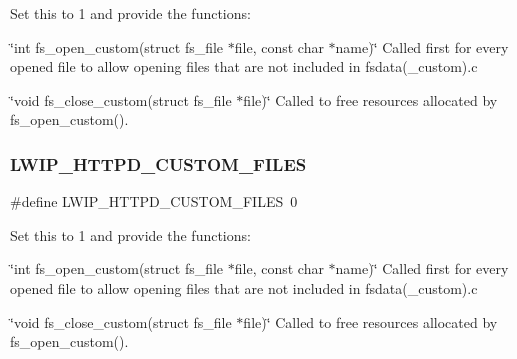 Set this to 1 and provide the functions\+:
\begin{DoxyItemize}
\item \char`\"{}int fs\+\_\+open\+\_\+custom(struct fs\+\_\+file $\ast$file, const char $\ast$name)\char`\"{} Called first for every opened file to allow opening files that are not included in fsdata(\+\_\+custom).c
\item \char`\"{}void fs\+\_\+close\+\_\+custom(struct fs\+\_\+file $\ast$file)\char`\"{} Called to free resources allocated by fs\+\_\+open\+\_\+custom(). 
\end{DoxyItemize}\mbox{\label{group__httpd__opts_gadadb70f5663cdf004bf879e3b5d326bd}} 
\subsubsection{\texorpdfstring{L\+W\+I\+P\+\_\+\+H\+T\+T\+P\+D\+\_\+\+C\+U\+S\+T\+O\+M\+\_\+\+F\+I\+L\+ES}{LWIP\_HTTPD\_CUSTOM\_FILES}\hspace{0.1cm}{\footnotesize\ttfamily [2/2]}}
{\footnotesize\ttfamily \#define L\+W\+I\+P\+\_\+\+H\+T\+T\+P\+D\+\_\+\+C\+U\+S\+T\+O\+M\+\_\+\+F\+I\+L\+ES~0}

Set this to 1 and provide the functions\+:
\begin{DoxyItemize}
\item \char`\"{}int fs\+\_\+open\+\_\+custom(struct fs\+\_\+file $\ast$file, const char $\ast$name)\char`\"{} Called first for every opened file to allow opening files that are not included in fsdata(\+\_\+custom).c
\item \char`\"{}void fs\+\_\+close\+\_\+custom(struct fs\+\_\+file $\ast$file)\char`\"{} Called to free resources allocated by fs\+\_\+open\+\_\+custom(). 
\end{DoxyItemize}\mbox{\label{group__httpd__opts_ga1ee8d7c975c7e3d1c9d9dd9b43660c79}} 
